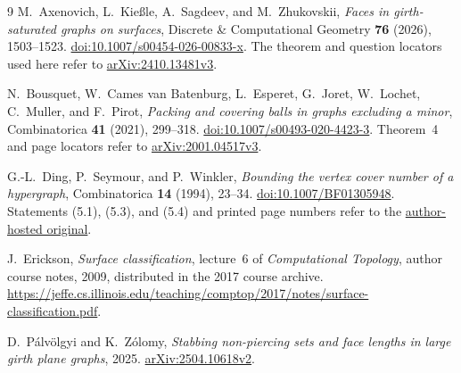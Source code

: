 \documentclass[11pt]{article}
\theoremstyle{remark}
\begin{document}
\begin{thebibliography}{9}
M.~Axenovich, L.~Kie{\ss}le, A.~Sagdeev, and M.~Zhukovskii,
\emph{Faces in girth-saturated graphs on surfaces},
Discrete \& Computational Geometry \textbf{76} (2026), 1503--1523.
\href{https://doi.org/10.1007/s00454-026-00833-x}{doi:10.1007/s00454-026-00833-x}.
The theorem and question locators used here refer to
\href{https://arxiv.org/abs/2410.13481v3}{arXiv:2410.13481v3}.

N.~Bousquet, W.~Cames van Batenburg, L.~Esperet, G.~Joret,
W.~Lochet, C.~Muller, and F.~Pirot,
\emph{Packing and covering balls in graphs excluding a minor},
Combinatorica \textbf{41} (2021), 299--318.
\href{https://doi.org/10.1007/s00493-020-4423-3}{doi:10.1007/s00493-020-4423-3}.
Theorem~4 and page locators refer to
\href{https://arxiv.org/abs/2001.04517v3}{arXiv:2001.04517v3}.

G.-L.~Ding, P.~Seymour, and P.~Winkler,
\emph{Bounding the vertex cover number of a hypergraph},
Combinatorica \textbf{14} (1994), 23--34.
\href{https://doi.org/10.1007/BF01305948}{doi:10.1007/BF01305948}.
Statements (5.1), (5.3), and (5.4) and printed page numbers refer to the
\href{https://math.dartmouth.edu/~pw/papers/hyperg.ps}{author-hosted original}.

J.~Erickson, \emph{Surface classification}, lecture~6 of
\emph{Computational Topology}, author course notes, 2009,
distributed in the 2017 course archive.
\url{https://jeffe.cs.illinois.edu/teaching/comptop/2017/notes/surface-classification.pdf}.

D.~P\'alv\"olgyi and K.~Z\'olomy,
\emph{Stabbing non-piercing sets and face lengths in large girth plane graphs},
2025.
\href{https://arxiv.org/abs/2504.10618v2}{arXiv:2504.10618v2}.
\end{thebibliography}
\end{document}
